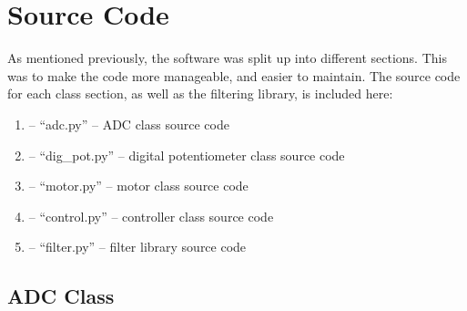 \documentclass[twoside,a4]{report}
\def\shorttitle{Development of a Rheometer Controller}
\def\achapter{\shorttitle}  %
\begin{document}
\def\achapter{Appendices}
\setcounter{page}{1}
\setcounter{secnumdepth}{0}
\setcounter{section}{1}

\setcounter{apsec}{0}
\def\apsect#1{
	\addtocounter{apsec}{1}
	\section{\arabic{apsec}\hskip0.5cm #1}
	\setcounter{apsubsec}{1}
}
\def\apsubsect#1{
	\subsection*{\Alph{apsubsec} \hskip0.5cm #1}
	\addtocounter{apsubsec}{1}
}

\apsect{Source Code}
As mentioned previously, the software was split up into different sections. This was to make the code more manageable, and easier to maintain. The source code for each class section, as well as the filtering library, is included here:
\renewcommand{\labelenumi}{\Alph{enumi}}
\begin{enumerate}
	\item -- ``adc.py'' -- ADC class source code
	\item -- ``dig\_pot.py'' -- digital potentiometer class source code
	\item -- ``motor.py'' -- motor class source code
	\item -- ``control.py'' -- controller class source code
	\item -- ``filter.py'' -- filter library source code
\end{enumerate}
\apsubsect{ADC Class}
\end{document}
